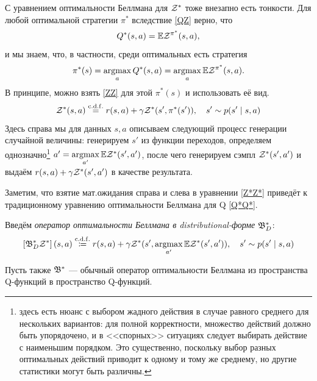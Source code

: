 С уравнением оптимальности Беллмана для $\mathcal{Z}^*$ тоже внезапно есть тонкости. Для любой оптимальной стратегии  $\pi^*$ вследствие \eqref{QZ} верно, что
$$Q^*(s, a) = \mathbb{E} \mathcal{Z}^{\pi^*}(s, a),$$
и мы знаем, что, в частности, среди оптимальных есть стратегия
$$\pi^*(s) = \mathop{\mathrm{argmax}}\limits_a Q^*(s, a) = \mathop{\mathrm{argmax}}\limits_a \mathbb{E} \mathcal{Z}^{\pi^*}(s, a).$$
В принципе, можно взять \eqref{ZZ} для этой $\pi^*(s)$ и использовать её вид.
\begin{equation}\label{Z*Z*}
\mathcal{Z}^*(s, a) \mathrel{\stackrel{\mathrm{c.d.f.}}=} r(s, a) + \gamma \mathcal{Z}^*(s', \pi^*(s')), \quad s' \sim p(s' \mid s, a)
\end{equation}
Здесь справа мы для данных $s, a$ описываем следующий процесс генерации случайной величины: генерируем $s'$ из функции переходов, определяем однозначно\footnote{здесь есть нюанс с выбором жадного действия в случае равного среднего для нескольких вариантов: для полной корректности, множество действий должно быть упорядочено, и в <<спорных>> ситуациях следует выбирать действие с наименьшим порядком. Это существенно, поскольку выбор разных оптимальных действий приводит к одному и тому же среднему, но другие статистики могут быть различны.} $a' = \mathop{\mathrm{argmax}}\limits_{a'} \mathbb{E} \mathcal{Z}^*(s', a')$, после чего генерируем сэмпл $\mathcal{Z}^*(s', a')$ и выдаём $r(s, a) + \gamma \mathcal{Z}^*(s', a')$ в качестве результата.

Заметим, что взятие мат.ожидания справа и слева в уравнении \eqref{Z*Z*} приведёт к традиционному уравнению оптимальности Беллмана для Q \eqref{Q*Q*}.

\begin{definition}
Введём \emph{оператор оптимальности Беллмана в distributional-форме} $\mathfrak{B}^*_D$:
$$\left[\mathfrak{B}^*_D \mathcal{Z}^* \right] (s, a) \mathrel{\stackrel{\mathrm{c.d.f.}}\coloneqq} r(s, a) + \gamma \mathcal{Z}^*(s', \mathop{\mathrm{argmax}}\limits_{a'} \mathbb{E} \mathcal{Z}^*(s', a')), \quad s' \sim p(s' \mid s, a)$$
\end{definition}

Пусть также $\mathfrak{B}^*$ --- обычный оператор оптимальности Беллмана из пространства Q-функций в пространство Q-функций.


